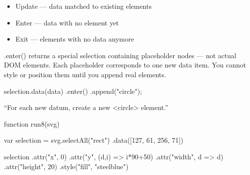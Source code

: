 \documentclass{report}
\begin{document}
\begin{itemize}
            \begin{itemize}
                \item Update — data matched to existing elements
                \item Enter — data with no element yet
                \item Exit — elements with no data anymore
            \end{itemize}
            \bigbreak \noindent 
            .enter() returns a special selection containing placeholder nodes — not actual DOM elements. Each placeholder corresponds to one new data item. You cannot style or position them until you append real elements.
            \bigbreak \noindent 
            \begin{jscode}
                selection.data(data)
                    .enter()
                    .append("circle");
            \end{jscode}
            \bigbreak \noindent 
            “For each new datum, create a new <circle> element.”
            \bigbreak \noindent 
            \begin{jscode}
            function run8(svg) {
                var selection = svg.selectAll("rect")
                .data([127, 61, 256, 71])

                selection
                    .attr("x", 0)
                    .attr("y", (d,i) => i*90+50)
                    .attr("width", d => d)
                    .attr("height", 20)
                    .style("fill", "steelblue")

}
\end{jscode}
\end{itemize}
\end{document}
